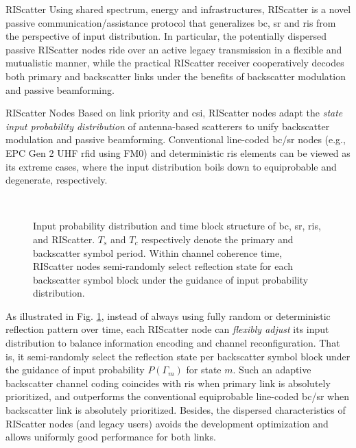 \documentclass[journal]{IEEEtran}
\begin{document}
\begin{section}{RIScatter}
	Using shared spectrum, energy and infrastructures, RIScatter is a novel passive communication/assistance protocol that generalizes \gls{bc}, \gls{sr} and \gls{ris} from the perspective of input distribution.
	In particular, the potentially dispersed passive RIScatter nodes ride over an active legacy transmission in a flexible and mutualistic manner, while the practical RIScatter receiver cooperatively decodes both primary and backscatter links under the benefits of backscatter modulation and passive beamforming.
	\begin{subsection}{RIScatter Nodes}
		Based on link priority and \gls{csi}, RIScatter nodes adapt the \emph{state input probability distribution} of antenna-based scatterers to unify backscatter modulation and passive beamforming.
		Conventional line-coded \gls{bc}/\gls{sr} nodes (e.g., EPC Gen 2 UHF \gls{rfid} using FM0) and deterministic \gls{ris} elements can be viewed as its extreme cases, where the input distribution boils down to equiprobable and degenerate, respectively.
		\begin{figure}[!t]
			\centering
			\\
			\caption{
				Input probability distribution and time block structure of \gls{bc}, \gls{sr}, \gls{ris}, and RIScatter.
				$T_s$ and $T_c$ respectively denote the primary and backscatter symbol period.
				Within channel coherence time, RIScatter nodes semi-randomly select reflection state for each backscatter symbol block under the guidance of input probability distribution.
			}
			\label{fi:riscatter_distribution}
		\end{figure}
		As illustrated in Fig. \ref{fi:riscatter_distribution}, instead of always using fully random or deterministic reflection pattern over time, each RIScatter node can \emph{flexibly adjust} its input distribution to balance information encoding and channel reconfiguration.
		That is, it semi-randomly select the reflection state per backscatter symbol block under the guidance of input probability $P(\Gamma_m)$ for state $m$.
		Such an adaptive backscatter channel coding coincides with \gls{ris} when primary link is absolutely prioritized, and outperforms the conventional equiprobable line-coded \gls{bc}/\gls{sr} when backscatter link is absolutely prioritized.
		Besides, the dispersed characteristics of RIScatter nodes (and legacy users) avoids the development optimization and allows uniformly good performance for both links.


\end{subsection}
\end{section}
\end{document}
